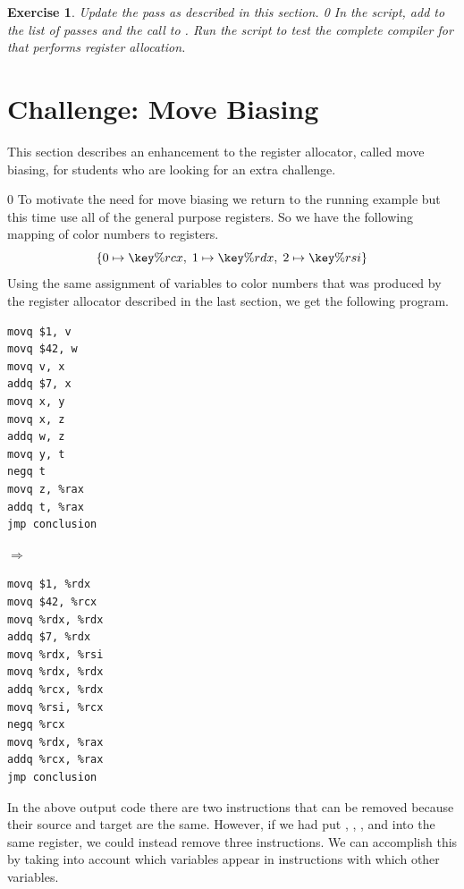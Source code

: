\documentclass[7x10,nocrop]{TimesAPriori_MIT}%
\def\racketEd{0}
\def\edition{1}
\newcommand{\racket}[1]{{\if\edition\racketEd{#1}\fi}}
\newtheorem{exercise}[theorem]{Exercise}
\begin{document}
\begin{exercise}\normalfont
Update the  pass as described in this section.
%
\racket{
In the  script, add \code{prelude\_and\_conclusion} to the
list of passes and the call to \code{compiler-tests}.}
%
Run the script to test the complete compiler for \LangVar{} that
performs register allocation.
\end{exercise}

\section{Challenge: Move Biasing}
\label{sec:move-biasing}

This section describes an enhancement to the register allocator,
called move biasing, for students who are looking for an extra
challenge.

{\if\edition\racketEd      
To motivate the need for move biasing we return to the running example
but this time use all of the general purpose registers.  So we have
the following mapping of color numbers to registers.
\[
  \{ 0 \mapsto \key{\%rcx}, \; 1 \mapsto \key{\%rdx}, \; 2 \mapsto \key{\%rsi} \}
\]
Using the same assignment of variables to color numbers that was
produced by the register allocator described in the last section, we
get the following program.
\begin{center}
\begin{minipage}{0.3\textwidth}
\begin{lstlisting}
movq $1, v
movq $42, w
movq v, x
addq $7, x
movq x, y
movq x, z
addq w, z
movq y, t
negq t
movq z, %rax
addq t, %rax
jmp conclusion
\end{lstlisting}
\end{minipage}
$\Rightarrow\qquad$
\begin{minipage}{0.45\textwidth}
\begin{lstlisting}
movq $1, %rdx
movq $42, %rcx
movq %rdx, %rdx
addq $7, %rdx
movq %rdx, %rsi
movq %rdx, %rdx
addq %rcx, %rdx
movq %rsi, %rcx
negq %rcx
movq %rdx, %rax
addq %rcx, %rax
jmp conclusion
\end{lstlisting}
\end{minipage}
\end{center}
In the above output code there are two  instructions that
can be removed because their source and target are the same.  However,
if we had put , , , and  into the same
register, we could instead remove three  instructions.  We
can accomplish this by taking into account which variables appear in
 instructions with which other variables.
\fi}
\end{document}
